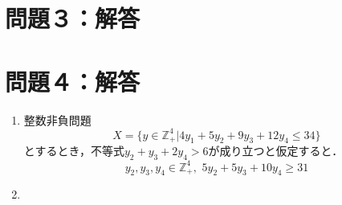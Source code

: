 \documentclass[a4paper,11pt]{jsarticle}
\numberwithin{theorem}{section}  %
\numberwithin{equation}{section} %
\begin{document}
\section{問題３：解答}
\section{問題４：解答}
\begin{enumerate}
\item
整数非負問題
\[
X=\{ y \in \mathbb{Z}_+^4 | 4y_1 + 5y_2 + 9y_3 + 12y_4 \le 34 \}
\]
とするとき，不等式$y_2+y_3+2y_4 > 6$が成り立つと仮定すると．
\[
y_2,y_3,y_4 \in \mathbb{Z}_+^4,\,\, 5y_2 + 5y_3 + 10y_4 \ge 31
\]
\item
\end{enumerate}
\end{document}
